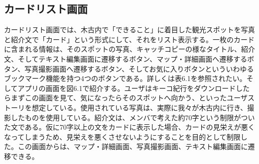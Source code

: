 \subsection{カードリスト画面}
カードリスト画面では、木古内で「できること」に着目した観光スポットを写真と紹介文で「カード」という形式にして、それをリスト表示する。一枚のカードに含まれる情報は、そのスポットの写真、キャッチコピーの様なタイトル、紹介文、そしてテキスト編集画面に遷移するボタン、マップ・詳細画面へ遷移するボタン、写真撮影画面へ遷移するボタン、そしてお気に入りボタンといういわゆるブックマーク機能を持つ4つのボタンである。詳しくは表6.1を参照されたい。そしてアプリの画面を図6.1で紹介する。ユーザはキーコ紀行をダウンロードしたらまずこの画面を見て、気になったらそのスポットへ向かう、といったユーザストーリを想定している。使用されている写真は、実際に我々が木古内に行き、撮影したものを使用している。紹介文は、メンバで考えた約70字という制限がついた文である。仮に70字以上の文をカードに表示した場合、カードの見栄えが悪くなってしまうため、見栄えを悪くさせないようにすることを目的として制限した。この画面からは、マップ・詳細画面、写真撮影画面、テキスト編集画面に遷移できる。

